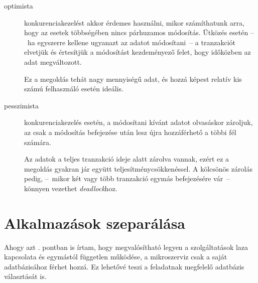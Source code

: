 \begin{description}
	\item[optimista] konkurenciakezelést akkor érdemes használni, mikor számíthatunk arra, hogy az esetek többségében nincs párhuzamos módosítás. Ütközés esetén --~ha egyszerre kellene ugyanazt az adatot módosítani~--   a tranzakciót elvetjük és értesítjük a módosítást kezdeményező felet, hogy időközben  az adat megváltozott.
	
	Ez a megoldás tehát nagy mennyiségű adat, és hozzá képest relatív kis számú felhasználó esetén ideális.
	
	\item[pesszimista] konkurenciakezelés esetén, a módosítani kívánt adatot olvasáskor zároljuk, az csak a módosítás befejezése után lesz újra hozzáférhető a többi fél számára.
	
	Az adatok a teljes tranzakció ideje alatt zárolva vannak, ezért ez a megoldás gyakran jár együtt teljesítménycsökkenéssel. A kölcsönös zárolás pedig, --~mikor két vagy több tranzakció egymás befejezésére vár~--   könnyen vezethet \emph{deadlock}hoz.
\end{description}


\section{Alkalmazások szeparálása}\label{sec:alkalmazasok_szeparalasa}
Ahogy azt . pontban is írtam, hogy megvalósítható legyen a szolgáltatások laza kapcsolata és egymástól független működése, a mikroszerviz csak a saját adatbázisához férhet hozzá. Ez lehetővé teszi a feladatnak megfelelő adatbázis választását is.

